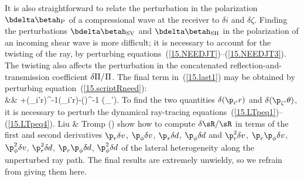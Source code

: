 {It is also straightforward to relate the perturbation in the polarization
$\bdelta\betah_{\rm P}$ of a compressional wave at the receiver to
$\delta i$ and $\delta\zeta$.  Finding the perturbations
$\bdelta\betah_{\rm SV}$ and $\bdelta\betah_{\rm SH}$
in the polarization of an incoming shear
wave is more difficult; it is necessary to
account for the twisting of the ray, by perturbing
equations~(\ref{15.NEEDJT})--(\ref{15.NEEDJT3}).
The twisting also affects the perturbation in the
concatenated reflection-and-transmission coefficient
$\delta\Pi/\hspace{0.2 mm}\Pi$.  The final term in~(\ref{15.last1})
may be obtained by perturbing equation~(\ref{15.scriptRneed}):
\eqa \label{15.last2} 
\nonumber \\
&&\mbox{}\qquad
+\half(\p_{i'}r)^{-1}\delta(\p_{i'}r)-\half(\sin\Theta)^{-1}
\delta(\p_{\zeta'}\theta).
\ena
To find the two quantities $\delta(\p_{i'}r)$
and $\delta(\p_{\zeta'}\theta)$,
it is necessary to perturb the dynamical ray-tracing
equations~(\ref{15.LTpeq1})--(\ref{15.LTpeq4}).
Liu \& Tromp (\citeyear{liu&tromp96}) show how to
compute $\delta\sR/\sR$ in terms of the first and
second derivatives $\p_r\delta v$, $\p_\phi\delta v$,
$\p_r\delta\hspace{-0.1 mm}d$, $\p_\phi\delta\hspace{-0.1 mm}d$
and $\p_r^2\delta v$, $\p_r\p_\phi\delta v$, $\p_\phi^2\delta v$,
$\p_r^2\delta\hspace{-0.1 mm}d$, $\p_r\p_\phi\delta\hspace{-0.1 mm}d$,
$\p_\phi^2\delta\hspace{-0.1 mm}d$ of the lateral heterogeneity along
the unperturbed ray path.  The final results are extremely unwieldy, so we
refrain from giving them here.

}
